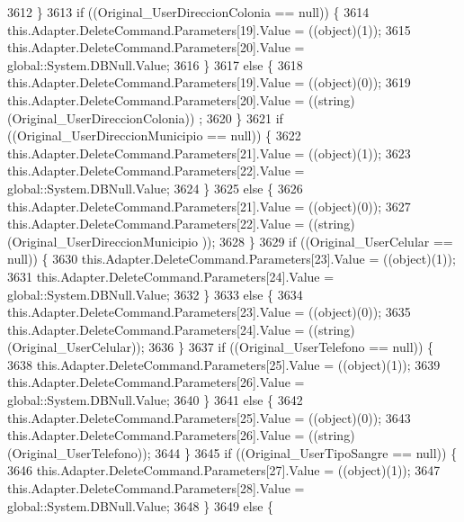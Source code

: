 \begin{DoxyCode}
3612             \}
3613             \textcolor{keywordflow}{if} ((Original\_UserDireccionColonia == null)) \{
3614                 this.Adapter.DeleteCommand.Parameters[19].Value = ((object)(1));
3615                 this.Adapter.DeleteCommand.Parameters[20].Value = global::System.DBNull.Value;
3616             \}
3617             \textcolor{keywordflow}{else} \{
3618                 this.Adapter.DeleteCommand.Parameters[19].Value = ((object)(0));
3619                 this.Adapter.DeleteCommand.Parameters[20].Value = ((string)(Original\_UserDireccionColonia))
      ;
3620             \}
3621             \textcolor{keywordflow}{if} ((Original\_UserDireccionMunicipio == null)) \{
3622                 this.Adapter.DeleteCommand.Parameters[21].Value = ((object)(1));
3623                 this.Adapter.DeleteCommand.Parameters[22].Value = global::System.DBNull.Value;
3624             \}
3625             \textcolor{keywordflow}{else} \{
3626                 this.Adapter.DeleteCommand.Parameters[21].Value = ((object)(0));
3627                 this.Adapter.DeleteCommand.Parameters[22].Value = ((string)(Original\_UserDireccionMunicipio
      ));
3628             \}
3629             \textcolor{keywordflow}{if} ((Original\_UserCelular == null)) \{
3630                 this.Adapter.DeleteCommand.Parameters[23].Value = ((object)(1));
3631                 this.Adapter.DeleteCommand.Parameters[24].Value = global::System.DBNull.Value;
3632             \}
3633             \textcolor{keywordflow}{else} \{
3634                 this.Adapter.DeleteCommand.Parameters[23].Value = ((object)(0));
3635                 this.Adapter.DeleteCommand.Parameters[24].Value = ((string)(Original\_UserCelular));
3636             \}
3637             \textcolor{keywordflow}{if} ((Original\_UserTelefono == null)) \{
3638                 this.Adapter.DeleteCommand.Parameters[25].Value = ((object)(1));
3639                 this.Adapter.DeleteCommand.Parameters[26].Value = global::System.DBNull.Value;
3640             \}
3641             \textcolor{keywordflow}{else} \{
3642                 this.Adapter.DeleteCommand.Parameters[25].Value = ((object)(0));
3643                 this.Adapter.DeleteCommand.Parameters[26].Value = ((string)(Original\_UserTelefono));
3644             \}
3645             \textcolor{keywordflow}{if} ((Original\_UserTipoSangre == null)) \{
3646                 this.Adapter.DeleteCommand.Parameters[27].Value = ((object)(1));
3647                 this.Adapter.DeleteCommand.Parameters[28].Value = global::System.DBNull.Value;
3648             \}
3649             \textcolor{keywordflow}{else} \{

\end{DoxyCode}
